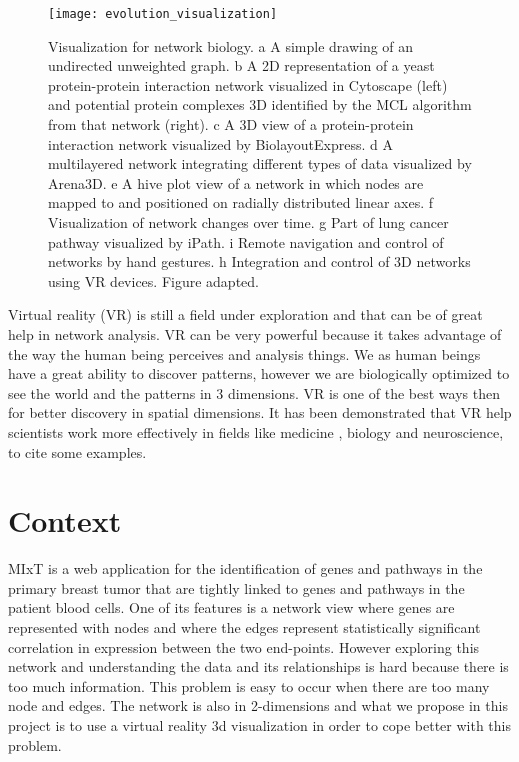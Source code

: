 \begin{figure}[h!]
    \newlength{\tempheight}
    \setlength{\tempheight}{15ex}
    \centering%
    \texttt{[image: evolution\_visualization]}
    \caption{Visualization for network biology. a A simple drawing of an undirected unweighted graph. b A 2D representation of a yeast protein-protein interaction network visualized in Cytoscape (left) and potential protein complexes 3D identified by the MCL algorithm from that network (right). c A 3D view of a protein-protein interaction network visualized by BiolayoutExpress. d A multilayered network integrating different types of data visualized by Arena3D. e A hive plot view of a network in which nodes are mapped to and positioned on radially distributed linear axes. f Visualization of network changes over time. g Part of lung cancer pathway visualized by iPath. i Remote navigation and control of networks by hand gestures. h Integration and control of 3D networks using VR devices. Figure adapted\cite{pavlopoulos_malliarakis_papanikolaou_theodosiou_enright_iliopoulos_2015}.}
    \label{fig:network_biology_evolution}
\end{figure}%

Virtual reality (VR) is still a field under exploration and that can be of great help in network analysis. VR can be very powerful because it takes advantage of the way the human being perceives and analysis things. We as human beings have a great ability to discover patterns, however we are biologically optimized to see the world and the patterns in 3 dimensions. VR is one of the best ways then for better discovery in spatial dimensions. It has been demonstrated that VR help scientists work more effectively in fields like medicine \cite{Laver11}\cite{xia_ip_samman_wong_gateno_wang_yeung_kot_tideman_2001}\cite{brain_damage_rehab}, biology\cite{10.1093/bioinformatics/bti581}\cite{thorley_lawson_duca_shapiro_2008} and neuroscience\cite{bohil_alicea_biocca_2011}\cite{minderer_harvey_donato_moser_2016}, to cite some examples.

\section{Context}

MIxT\cite{fjukstad_dumeaux_olsen_lund_hallett_bongo_2017}\cite{dumeaux_fjukstad_interactions_tumor_blood} is a web application for the identification of genes and pathways in the primary breast tumor that are tightly linked to genes and pathways in the patient blood cells. One of its features is a network view where genes are represented with nodes and where the edges represent statistically significant correlation in expression between the two end-points. However exploring this network and understanding the data and its relationships is hard because there is too much information. This problem is easy to occur when there are too many node and edges. The network is also in 2-dimensions and what we propose in this project is to use a virtual reality 3d visualization in order to cope better with this problem.

